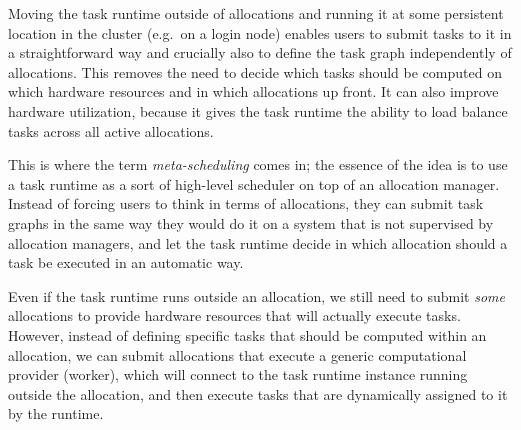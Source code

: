 \begin{description}[wide=0pt]
	\item[Task runtime runs outside of allocations] Moving the task runtime outside of allocations and running it at some persistent location in the
		cluster (e.g.\ on a login node) enables users to submit tasks to it in a straightforward way and
		crucially also to define the task graph independently of allocations. This removes the need to
		decide which tasks should be computed on which hardware resources and in which allocations up
		front. It can also improve hardware utilization, because it gives the task runtime the ability to
		load balance tasks across all active allocations.

		This is where the term \emph{meta-scheduling} comes in; the essence of the idea is to use a task
		runtime as a sort of high-level scheduler on top of an allocation manager. Instead of forcing users
		to think in terms of allocations, they can submit task graphs in the same way they would do it on a
		system that is not supervised by allocation managers, and let the task runtime decide in which
		allocation should a task be executed in an automatic way.

	\item[Allocations are uniform] Even if the task runtime runs outside an allocation, we still need to submit \emph{some}
		allocations to provide hardware resources that will actually execute tasks. However, instead of
		defining specific tasks that should be computed within an allocation, we can submit allocations
		that execute a generic computational provider (worker), which will connect to the task runtime
		instance running outside the allocation, and then execute tasks that are dynamically assigned to it
		by the runtime.


\end{description}
